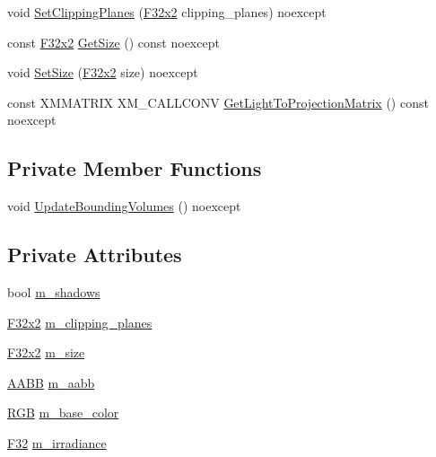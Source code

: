 \begin{DoxyCompactItemize}
\item 
void \mbox{\hyperlink{classmage_1_1rendering_1_1_directional_light_ae90562c217d876a3a2a73f36f36a700f}{Set\+Clipping\+Planes}} (\mbox{\hyperlink{namespacemage_a9dc0d34d6ecc87e4cfa4a826102117bc}{F32x2}} clipping\+\_\+planes) noexcept
\item 
const \mbox{\hyperlink{namespacemage_a9dc0d34d6ecc87e4cfa4a826102117bc}{F32x2}} \mbox{\hyperlink{classmage_1_1rendering_1_1_directional_light_ace3c9b19fcb107d45ecff698eb5c0d36}{Get\+Size}} () const noexcept
\item 
void \mbox{\hyperlink{classmage_1_1rendering_1_1_directional_light_aae69d3285b7980ad7215e1b517d0a8fd}{Set\+Size}} (\mbox{\hyperlink{namespacemage_a9dc0d34d6ecc87e4cfa4a826102117bc}{F32x2}} size) noexcept
\item 
const X\+M\+M\+A\+T\+R\+IX X\+M\+\_\+\+C\+A\+L\+L\+C\+O\+NV \mbox{\hyperlink{classmage_1_1rendering_1_1_directional_light_a865c8996fa02caf911718ac839435370}{Get\+Light\+To\+Projection\+Matrix}} () const noexcept
\end{DoxyCompactItemize}
\subsection*{Private Member Functions}
\begin{DoxyCompactItemize}
\item 
void \mbox{\hyperlink{classmage_1_1rendering_1_1_directional_light_ae87cdab887cc3f7e01b32485ff5aed5f}{Update\+Bounding\+Volumes}} () noexcept
\end{DoxyCompactItemize}
\subsection*{Private Attributes}
\begin{DoxyCompactItemize}
\item 
bool \mbox{\hyperlink{classmage_1_1rendering_1_1_directional_light_a64fa40ef9f9d0ae8a0856aabd44f0cae}{m\+\_\+shadows}}
\item 
\mbox{\hyperlink{namespacemage_a9dc0d34d6ecc87e4cfa4a826102117bc}{F32x2}} \mbox{\hyperlink{classmage_1_1rendering_1_1_directional_light_a296e8b5c22f96f0701744e0bedc4a17a}{m\+\_\+clipping\+\_\+planes}}
\item 
\mbox{\hyperlink{namespacemage_a9dc0d34d6ecc87e4cfa4a826102117bc}{F32x2}} \mbox{\hyperlink{classmage_1_1rendering_1_1_directional_light_ad983ca7abf8cf1f542fd68b4dfbf2ba2}{m\+\_\+size}}
\item 
\mbox{\hyperlink{classmage_1_1_a_a_b_b}{A\+A\+BB}} \mbox{\hyperlink{classmage_1_1rendering_1_1_directional_light_a33bf67ba5b273b3f7c7bce943696561d}{m\+\_\+aabb}}
\item 
\mbox{\hyperlink{structmage_1_1_r_g_b}{R\+GB}} \mbox{\hyperlink{classmage_1_1rendering_1_1_directional_light_a55d415fffd8f59f296e4d380639d3af1}{m\+\_\+base\+\_\+color}}
\item 
\mbox{\hyperlink{namespacemage_aa97e833b45f06d60a0a9c4fc22ae02c0}{F32}} \mbox{\hyperlink{classmage_1_1rendering_1_1_directional_light_a72b58bf80a9f40934622aee9f68aa545}{m\+\_\+irradiance}}
\end{DoxyCompactItemize}
